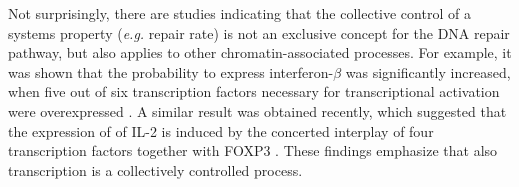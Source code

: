 Not surprisingly, there are studies indicating that the collective control of a systems property (\textit{e.g.} repair rate) is not an exclusive concept for the DNA repair pathway, but also applies to other chromatin-associated processes. For example, it was shown that the probability to express interferon-$\beta$ was significantly increased, when five out of six transcription factors necessary for transcriptional activation were overexpressed \cite{Apostolou2008}. A similar result was obtained recently, which suggested that the expression of of IL-2 is induced by the concerted interplay of four transcription factors together with FOXP3 \label{sec:FOXp3} \cite{Bendfeldt2012}. These findings emphasize that also transcription is a collectively controlled process.   

%
%

